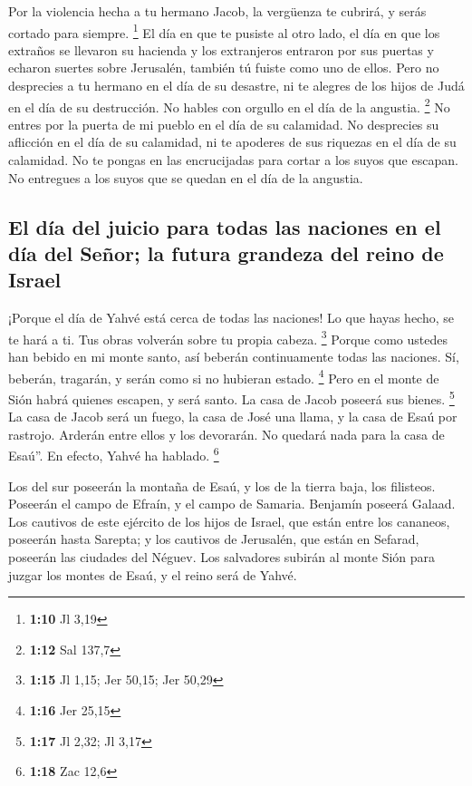 \begin{paracol}{2}
 Por la violencia hecha a tu hermano Jacob, la vergüenza
te cubrirá, y serás cortado para siempre. \footnote{\textbf{1:10} Jl
  3,19}  El día en que te pusiste al otro lado, el día en
que los extraños se llevaron su hacienda y los extranjeros entraron por
sus puertas y echaron suertes sobre Jerusalén, también tú fuiste como
uno de ellos.  Pero no desprecies a tu hermano en el día
de su desastre, ni te alegres de los hijos de Judá en el día de su
destrucción. No hables con orgullo en el día de la angustia. \footnote{\textbf{1:12}
  Sal 137,7}  No entres por la puerta de mi pueblo en el
día de su calamidad. No desprecies su aflicción en el día de su
calamidad, ni te apoderes de sus riquezas en el día de su calamidad.
 No te pongas en las encrucijadas para cortar a los suyos
que escapan. No entregues a los suyos que se quedan en el día de la
angustia.

\hypertarget{el-duxeda-del-juicio-para-todas-las-naciones-en-el-duxeda-del-seuxf1or-la-futura-grandeza-del-reino-de-israel}{%
\subsection{El día del juicio para todas las naciones en el día del
Señor; la futura grandeza del reino de
Israel}\label{el-duxeda-del-juicio-para-todas-las-naciones-en-el-duxeda-del-seuxf1or-la-futura-grandeza-del-reino-de-israel}}

 ¡Porque el día de Yahvé está cerca de todas las
naciones! Lo que hayas hecho, se te hará a ti. Tus obras volverán sobre
tu propia cabeza. \footnote{\textbf{1:15} Jl 1,15; Jer 50,15; Jer 50,29}
 Porque como ustedes han bebido en mi monte santo, así
beberán continuamente todas las naciones. Sí, beberán, tragarán, y serán
como si no hubieran estado. \footnote{\textbf{1:16} Jer 25,15}
 Pero en el monte de Sión habrá quienes escapen, y será
santo. La casa de Jacob poseerá sus bienes. \footnote{\textbf{1:17} Jl
  2,32; Jl 3,17}  La casa de Jacob será un fuego, la casa
de José una llama, y la casa de Esaú por rastrojo. Arderán entre ellos y
los devorarán. No quedará nada para la casa de Esaú''. En efecto, Yahvé
ha hablado. \footnote{\textbf{1:18} Zac 12,6}

 Los del sur poseerán la montaña de Esaú, y los de la
tierra baja, los filisteos. Poseerán el campo de Efraín, y el campo de
Samaria. Benjamín poseerá Galaad.  Los cautivos de este
ejército de los hijos de Israel, que están entre los cananeos, poseerán
hasta Sarepta; y los cautivos de Jerusalén, que están en Sefarad,
poseerán las ciudades del Néguev.  Los salvadores subirán
al monte Sión para juzgar los montes de Esaú, y el reino será de Yahvé.
\switchcolumn \begin{otherlanguage}{english}


\end{otherlanguage}
\end{paracol}
